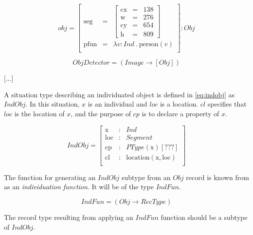 \documentclass[11pt, a4paper]{article}
\begin{document}
\begin{equation}\label{eq:objrec}
obj =
\left[\begin{array}{rcl}
\text{seg} &=& \left[\begin{array}{rcl}
\text{cx} &=& 138\\
\text{w} &=& 276\\
\text{cy} &=& 654\\
\text{h} &=& 809
\end{array}\right]\\
\text{pfun} &=& \lambda v:Ind\ .\ \text{person}(v)\\
\end{array}\right] : Obj\end{equation}

\begin{equation}\label{eq:objdetector}
ObjDetector = ( Image \rightarrow [Obj] )
\end{equation}

[...]

A situation type describing an individuated object is defined in \autoref{eq:indobj} as $IndObj$.
In this situation, $x$ is an individual and $loc$ is a location.
$cl$ specifies that $loc$ is the location of $x$, and the purpose of $cp$ is to declare a property of $x$.

\begin{equation}\label{eq:indobj}
IndObj = \left[\begin{array}{rcl}
\text{x} &:& Ind \\
\text{loc} &:& Segment \\
\text{cp} &:& PType(\text{x}) [???] \\
\text{cl} &:& \text{location}(\text{x}, \text{loc}) \\
\end{array}\right]
\end{equation}

The function for generating an $IndObj$ subtype from an $Obj$ record is known from \cite{lspc} as an \textit{individuation function}.
It will be of the type $IndFun$.

\begin{equation}\label{eq:indfun}
IndFun = ( Obj \rightarrow RecType )
\end{equation}

The record type resulting from applying an $IndFun$ function should be a subtype of $IndObj$.
\end{document}
